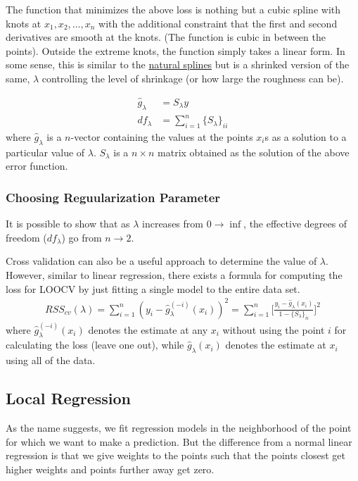 \documentclass[11pt, a4paper]{article}
\begin{document}
    The function that minimizes the above loss is nothing but a cubic spline with knots at $x_{1}, x_{2}, \ldots, x_{n}$ with the additional constraint that the first and second derivatives are smooth at the knots. (The function is cubic in between the points). Outside the extreme knots, the function simply takes a linear form.\newline
    In some sense, this is similar to the \hyperlink{naturalsplines}{natural splines} but is a shrinked version of the same, $\lambda$ controlling the level of shrinkage (or how large the roughness can be).

    \begin{align*}
        \hat{g}_{\lambda} &= S_{\lambda}y\\
        df_{\lambda} &= \sum_{i=1}^{n} \{S_{\lambda}\}_{ii}
    \end{align*}
    where $\hat{g}_{\lambda}$ is a $n$-vector containing the values at the points $x_{i}$s as a solution to  a particular value of $\lambda$. $S_{\lambda}$ is a $n\times n$ matrix obtained as the solution of the above error function.

    
    \subsubsection{Choosing Reguularization Parameter}
    It is possible to show that as $\lambda$ increases from $0 \to \inf$, the effective degrees of freedom ($df_{\lambda}$) go from $n \to 2$.\newline

    Cross validation can also be a useful approach  to determine the value of $\lambda$. However, similar to linear regression, there exists a formula for computing the loss for LOOCV by just fitting a single model to the entire data set.
    \begin{align*}
        RSS_{cv}(\lambda) = \sum_{i=1}^{n} (y_{i} - \hat{g}_{\lambda}^{(-i)}(x_{i}))^{2} = \sum_{i=1}^{n} \bigg[ \frac{y_{i} - \hat{g}_{\lambda}(x_{i})}{1 - \{S_{\lambda}\}_{ii}} \bigg]^{2}
    \end{align*}
    where $\hat{g}_{\lambda}^{(-i)}(x_{i})$ denotes the estimate at any $x_{i}$ without using the point $i$ for calculating the loss (leave one out), while $\hat{g}_{\lambda}(x_{i})$ denotes the estimate at $x_{i}$ using all of the data.


    \subsection{Local Regression}
    As the name suggests, we fit regression models in the neighborhood of the point for which we want to make a prediction. But the difference from a normal linear regression is that we give weights to the points such that the points closest get higher weights and points further away get zero.\newline
\end{document}
